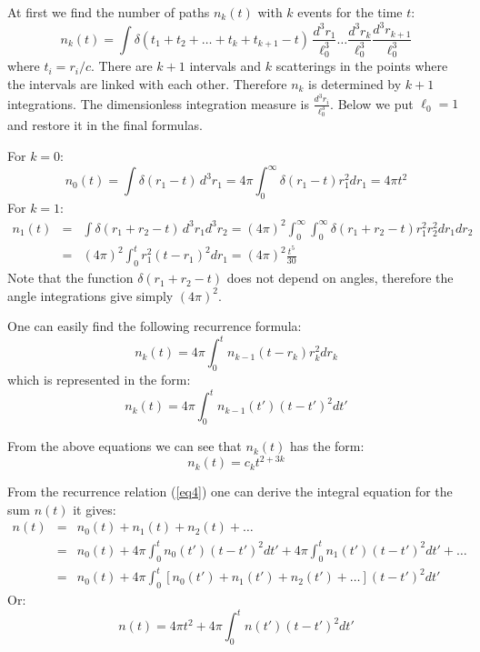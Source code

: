 \documentclass[a4paper,12pt]{article}
\begin{document}
At first we find the number of paths $n_k(t)$ with $k$ events for the time $t$:
\begin{equation}\label{eq1}
n_{k}(t) = \int\delta(t_{1}+t_{2}+\ldots +t_{k}+t_{k+1}-t)\,
\frac{d^{3}r_{1}}{\ell_0^3}\ldots \frac{d^{3}r_{k}}{\ell_0^3}
\frac{d^{3}r_{k+1}}{\ell_0^3}
\end{equation}
where $t_i=r_i/c$.
There are $k+1$ intervals and $k$ scatterings in the points where the intervals
are
linked with each other. Therefore $n_{k}$ is determined by $k+1$ integrations.
The dimensionless integration measure is $\frac{d^{3}r_{i}}{\ell_0^3}$.
Below we put $\ell_0=1$ and restore it in the final formulas.

For $k=0$:
\begin{equation}\label{eq2}
n_{0}(t) = \int\delta(r_{1}-t)\,
d^{3}r_{1}=4\pi \int_0^{\infty}\delta(r_{1}-t)r_{1}^2 dr_{1}=4\pi t^2
\end{equation}
For $k=1$:
\begin{eqnarray}\label{eq3}
n_{1}(t) &=& \int\delta(r_{1}+r_{2}-t)\,
d^{3}r_{1}d^{3}r_{2}
=(4\pi)^2 \int_0^{\infty}\int_0^{\infty}
\delta(r_{1}+r_{2}-t)r_{1}^2 r_{2}^2dr_{1}dr_{2}
\nonumber\\
&=&(4\pi)^2 \int_0^{t}r_{1}^2 (t-r_{1})^2dr_{1}
=(4\pi)^2 \frac{t^5}{30}
\end{eqnarray}
Note that the function $\delta(r_{1}+r_{2}-t)$ does not depend on angles,
therefore the
angle integrations give simply $(4\pi)^2$.

One can easily find the following recurrence formula:
$$
n_{k}(t) =4\pi \int_0^{t}n_{k-1}(t-r_k)r_k^2 dr_k
$$
which is represented in the form:
\begin{equation}\label{eq4}
n_{k}(t) =4\pi \int_0^{t}n_{k-1}(t')(t-t')^2 dt'
\end{equation}


    From the above equations we can see that $n_{k}(t)$ has the form:
\begin{equation}\label{eq5}
n_{k}(t)=c_{k} t^{2+3k}
\end{equation}


    From the recurrence relation (\ref{eq4}) one can derive the
integral equation
for the sum $n(t)$ it gives:
\begin{eqnarray*}
n(t)&=&n_0(t)+n_1(t)+n_2(t)+\ldots
\\
&=&
n_0(t)+ 4\pi \int_0^{t}n_{0}(t')(t-t')^2 dt'
+ 4\pi \int_0^{t}n_{1}(t')(t-t')^2 dt'+\ldots
\\
&=&
n_0(t)+ 4\pi \int_0^{t}[n_0(t')+n_1(t')+n_2(t')+\ldots](t-t')^2 dt'
\end{eqnarray*}
Or:
\begin{equation}\label{eq7}
n(t)=4\pi t^2+ 4\pi\int_0^{t}n(t')(t-t')^2 dt'
\end{equation}
\end{document}
